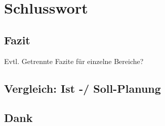 
\chapter{Schlusswort} \label{chap:Finish}

\section{Fazit}
Evtl. Getrennte Fazite für einzelne Bereiche?

\section{Vergleich: Ist -/ Soll-Planung}




\section{Dank}
